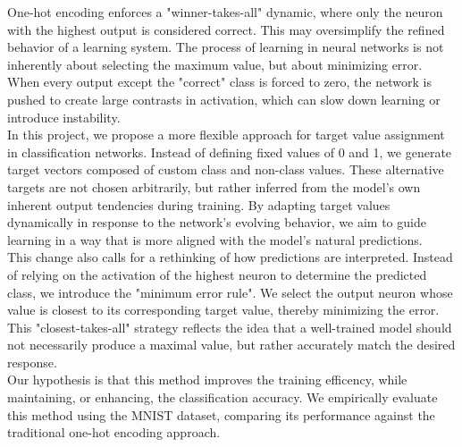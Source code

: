 \documentclass[12pt,fleqn,a4paper]{article}
\begin{document}
One-hot encoding enforces a "winner-takes-all" dynamic, where only the neuron with the highest output is considered correct. This may oversimplify the refined behavior of a learning system. The process of learning in neural networks is not inherently about selecting the maximum value, but about minimizing error. When every output except the "correct" class is forced to zero, the network is pushed to create large contrasts in activation, which can slow down learning or introduce instability. \\

In this project, we propose a more flexible approach for target value assignment in classification networks. Instead of defining fixed values of 0 and 1, we generate target vectors composed of custom class and non-class values. These alternative targets are not chosen arbitrarily, but rather inferred from the model's own inherent output tendencies during training. By adapting target values dynamically in response to the network's evolving behavior, we aim to guide learning in a way that is more aligned with the model's natural predictions. \\

This change also calls for a rethinking of how predictions are interpreted. Instead of relying on the activation of the highest neuron to determine the predicted class, we introduce the "minimum error rule". We select the output neuron whose value is closest to its corresponding target value, thereby minimizing the error. This "closest-takes-all" strategy reflects the idea that a well-trained model should not necessarily produce a maximal value, but rather accurately match the desired response. \\

Our hypothesis is that this method improves the training efficency, while maintaining, or enhancing, the classification accuracy. We empirically evaluate this method using the MNIST dataset, comparing its performance against the traditional one-hot encoding approach. \\





\newpage
\end{document}
